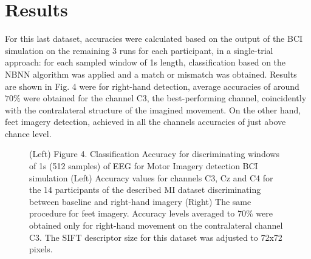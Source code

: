 \section{Results}

For this last dataset, accuracies were calculated based on the output of the BCI simulation on the remaining 3 runs for each participant, in a single-trial approach: for each sampled window of 1s length, classification based on the NBNN algorithm was applied and a match or mismatch was obtained.  Results are shown in Fig. 4 were for right-hand detection, average accuracies of around $70\%$ were obtained for the channel C3, the best-performing channel, coincidently with the contralateral structure of the imagined movement.  On the other hand, feet imagery detection, achieved in all the channels accuracies of just above chance level.

  \begin{figure}[thpb]
      \centering
      \setlength\fboxsep{0pt}
	  \setlength\fboxrule{0.5pt}
      \caption[Alpha Waves Classification]{(Left) Figure 4. 	Classification Accuracy for discriminating windows of 1s (512 samples) of EEG for Motor Imagery detection BCI simulation (Left) Accuracy values for channels C3, Cz and C4 for the 14 participants of the described MI dataset discriminating between baseline and right-hand imagery (Right) The same procedure for feet imagery. Accuracy levels averaged to $70\%$ were obtained only for right-hand movement on the contralateral channel C3. The SIFT descriptor size for this dataset was adjusted to 72x72 pixels.}
      \label{figure1}
   \end{figure}
   
